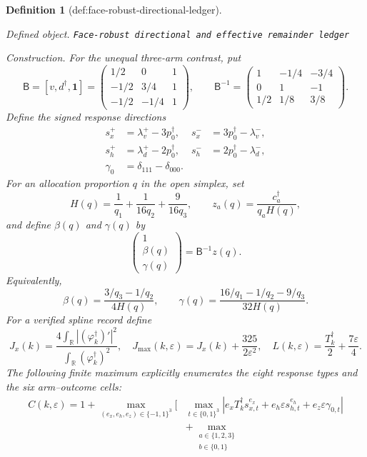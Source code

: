 \documentclass{article}
\newtheorem{definition}{Definition}
\begin{document}
\begin{definition}[def:face-robust-directional-ledger]\label{def:face-robust-directional-ledger}
\par\smallskip\noindent\emph{Defined object.} \texttt{Face-\allowbreak{}robust directional and effective remainder ledger}
\par\smallskip\noindent\emph{Construction.} For the unequal three-arm contrast, put
\[
\mathsf B=[v,d^\dagger,\mathbf 1]
=\begin{pmatrix}
1/2&0&1\\
-1/2&3/4&1\\
-1/2&-1/4&1
\end{pmatrix},
\qquad
\mathsf B^{-1}=
\begin{pmatrix}
1&-1/4&-3/4\\
0&1&-1\\
1/2&1/8&3/8
\end{pmatrix}.
\]
Define the signed response directions
\[
\begin{aligned}
s_x^+&=\lambda_v^+-3p_0^\dagger,&
s_x^-&=3p_0^\dagger-\lambda_v^-,\\
s_h^+&=\lambda_d^+-2p_0^\dagger,&
s_h^-&=2p_0^\dagger-\lambda_d^-,\\
\gamma_0&=\delta_{111}-\delta_{000}.
\end{aligned}
\]
For an allocation proportion \(q\) in the open simplex, set
\[
H(q)=\frac1{q_1}+\frac1{16q_2}+\frac9{16q_3},
\qquad
z_a(q)=\frac{c_a^\dagger}{q_aH(q)},
\]
and define \(\beta(q)\) and \(\gamma(q)\) by
\[
\begin{pmatrix}1\\ \beta(q)\\ \gamma(q)\end{pmatrix}
=\mathsf B^{-1}z(q).
\]
Equivalently,
\[
\beta(q)=\frac{3/q_3-1/q_2}{4H(q)},
\qquad
\gamma(q)=\frac{16/q_1-1/q_2-9/q_3}{32H(q)}.
\]
For a verified spline record define
\[
J_x(k)=\frac{4\int_{\mathbb R}|(\varphi_k^\dagger)'|^2}
{\int_{\mathbb R}(\varphi_k^\dagger)^2},
\quad
J_{\max}(k,\varepsilon)=J_x(k)+\frac{325}{2\varepsilon^2},
\quad
L(k,\varepsilon)=\frac{T_k^\dagger}{2}+\frac{7\varepsilon}{4}.
\]
The following finite maximum explicitly enumerates the eight response types and the six arm--outcome cells:
\[
\begin{aligned}
C(k,\varepsilon)=1+
\max_{(e_x,e_h,e_z)\in\{-1,1\}^3}
\Bigg[&\max_{t\in\{0,1\}^3}
\left|e_xT_k^\dagger s_{x,t}^{e_x}
+e_h\varepsilon s_{h,t}^{e_h}
+e_z\varepsilon\gamma_{0,t}\right|\\
&+\max_{\substack{a\in\{1,2,3\}\\ b\in\{0,1\}}}

\end{aligned}\]
\end{definition}
\end{document}
